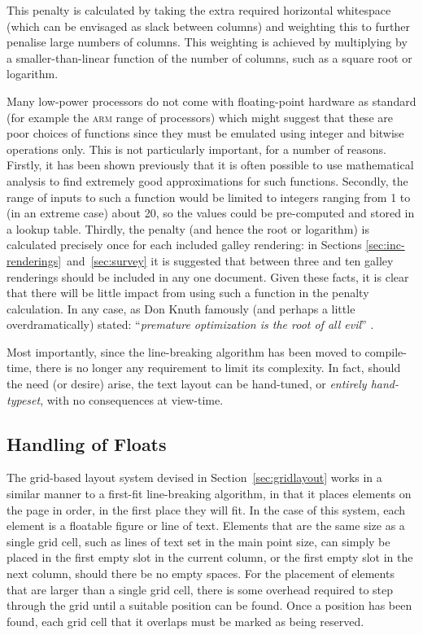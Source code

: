 This penalty is calculated by taking the extra required horizontal whitespace (which can be envisaged as slack between columns) and weighting this to further penalise large numbers of columns. This weighting is achieved by multiplying by a smaller-than-linear function of the number of columns, such as a square root or logarithm.

Many low-power processors do not come with floating-point hardware as standard (for example the \textsc{arm} range of processors) which might suggest that these are poor choices of functions since they must be emulated using integer and bitwise operations only. This is not particularly important, for a number of reasons. Firstly, it has been shown previously\hspace{0pt}\cite{Lomont2003} that it is often possible to use mathematical analysis to find extremely good approximations for such functions. Secondly, the range of inputs to such a function would be limited to integers ranging from 1 to (in an extreme case) about 20, so the values could be pre-computed and stored in a lookup table. Thirdly, the penalty (and hence the root or logarithm) is calculated precisely once for each included \gls{galley} rendering: in Sections \ref{sec:inc-renderings}~and~\ref{sec:survey} it is suggested that between three and ten \gls{galley} renderings should be included in any one document. Given these facts, it is clear that there will be little impact from using such a function in the penalty calculation. In any case, as Don Knuth famously (and perhaps a little overdramatically) stated: ``\emph{premature optimization is the root of all evil}'' \cite{Knuth1974}.


Most importantly, since the line-breaking algorithm has been moved to compile-time, there is no longer any requirement to limit its complexity. In fact, should the need (or desire) arise, the text layout can be hand-tuned, or \emph{entirely hand-typeset}, with no consequences at view-time.


\subsection{Handling of Floats}
\label{sec:quant-floats}

The grid-based layout system devised in Section~\ref{sec:gridlayout} works in a similar manner to a first-fit line-breaking algorithm, in that it places elements on the page in order, in the first place they will fit. In the case of this system, each element is a floatable figure or line of text. Elements that are the same size as a single grid cell, such as lines of text set in the main \gls{point} size, can simply be placed in the first empty slot in the current column, or the first empty slot in the next column, should there be no empty spaces.  For the placement of elements that are larger than a single grid cell, there is some overhead required to step through the grid until a suitable position can be found. Once a position has been found, each grid cell that it overlaps must be marked as being reserved.

